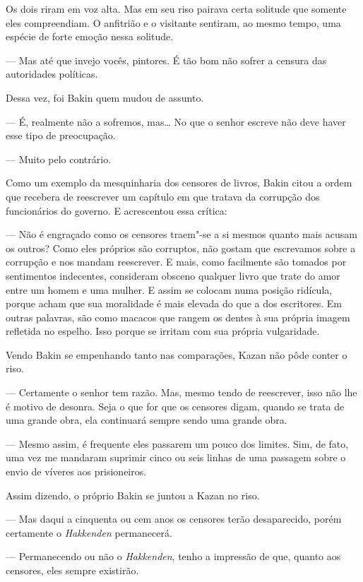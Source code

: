 Os dois riram em voz alta. Mas em seu riso pairava certa solitude que
somente eles compreendiam. O anfitrião e o visitante sentiram, ao mesmo
tempo, uma espécie de forte emoção nessa solitude. 

--- Mas até que invejo vocês, pintores. É tão bom não sofrer a censura das
autoridades políticas.

Dessa vez, foi Bakin quem mudou de assunto.

\sectionitem
--- É, realmente não a sofremos, mas\ldots{} No que o senhor escreve não deve
haver esse tipo de preocupação.

--- Muito pelo contrário.

Como um exemplo da mesquinharia dos censores de livros, Bakin citou a
ordem que recebera de reescrever um capítulo em que tratava da
corrupção dos funcionários do governo. E acrescentou essa crítica:

--- Não é engraçado como os censores traem"-se a si mesmos quanto mais
acusam os outros? Como eles próprios são corruptos, não gostam que
escrevamos sobre a corrupção e nos mandam reescrever. E mais, como
facilmente são tomados por sentimentos indecentes, consideram obsceno
qualquer livro que trate do amor entre um homem e uma mulher. E assim
se colocam numa posição ridícula, porque acham que sua moralidade é
mais elevada do que a dos escritores. Em outras palavras, são como
macacos que rangem os dentes à sua própria imagem refletida no espelho.
Isso porque se irritam com sua própria vulgaridade.

Vendo Bakin se empenhando tanto nas comparações, Kazan não pôde conter o
riso.

--- Certamente o senhor tem razão. Mas, mesmo tendo de reescrever, isso
não lhe é motivo de desonra. Seja o que for que os censores digam, 
quando se trata de uma grande obra, ela continuará sempre sendo uma
grande obra.

--- Mesmo assim, é frequente eles passarem um pouco dos limites. Sim, de
fato, uma vez me mandaram suprimir cinco ou seis linhas de uma passagem
sobre o envio de víveres aos prisioneiros.

Assim dizendo, o próprio Bakin se juntou a Kazan no riso.

--- Mas daqui a cinquenta ou cem anos os censores terão desaparecido,
porém certamente o \textit{Hakkenden} permanecerá.

--- Permanecendo ou não o \textit{Hakkenden}, tenho a impressão de que,
quanto aos censores, eles sempre existirão.

